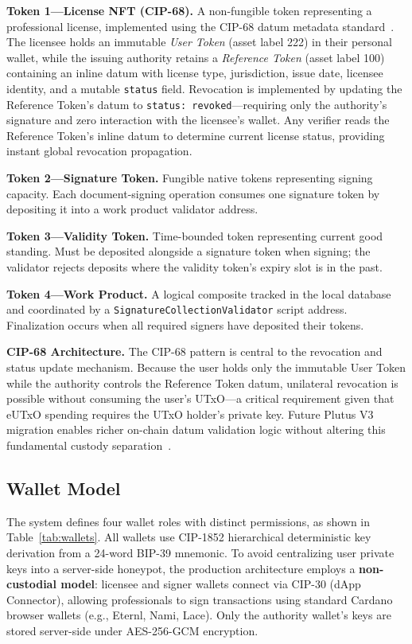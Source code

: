 \documentclass[conference,10pt]{IEEEtran}
\begin{document}
\textbf{Token 1---License NFT (CIP-68).} A non-fungible token representing a professional license, implemented using the CIP-68 datum metadata standard~\cite{cip68}. The licensee holds an immutable \emph{User Token} (asset label 222) in their personal wallet, while the issuing authority retains a \emph{Reference Token} (asset label 100) containing an inline datum with license type, jurisdiction, issue date, licensee identity, and a mutable \texttt{status} field. Revocation is implemented by updating the Reference Token's datum to \texttt{status: revoked}---requiring only the authority's signature and zero interaction with the licensee's wallet. Any verifier reads the Reference Token's inline datum to determine current license status, providing instant global revocation propagation.

\textbf{Token 2---Signature Token.} Fungible native tokens representing signing capacity. Each document-signing operation consumes one signature token by depositing it into a work product validator address.

\textbf{Token 3---Validity Token.} Time-bounded token representing current good standing. Must be deposited alongside a signature token when signing; the validator rejects deposits where the validity token's expiry slot is in the past.

\textbf{Token 4---Work Product.} A logical composite tracked in the local database and coordinated by a \texttt{SignatureCollectionValidator} script address. Finalization occurs when all required signers have deposited their tokens.

\textbf{CIP-68 Architecture.} The CIP-68 pattern is central to the revocation and status update mechanism. Because the user holds only the immutable User Token while the authority controls the Reference Token datum, unilateral revocation is possible without consuming the user's UTxO---a critical requirement given that eUTxO spending requires the UTxO holder's private key. Future Plutus V3 migration enables richer on-chain datum validation logic without altering this fundamental custody separation~\cite{cip68}.

\subsection{Wallet Model}

The system defines four wallet roles with distinct permissions, as shown in Table~\ref{tab:wallets}. All wallets use CIP-1852 hierarchical deterministic key derivation from a 24-word BIP-39 mnemonic. To avoid centralizing user private keys into a server-side honeypot, the production architecture employs a \textbf{non-custodial model}: licensee and signer wallets connect via CIP-30 (dApp Connector), allowing professionals to sign transactions using standard Cardano browser wallets (e.g., Eternl, Nami, Lace). Only the authority wallet's keys are stored server-side under AES-256-GCM encryption.
\end{document}

